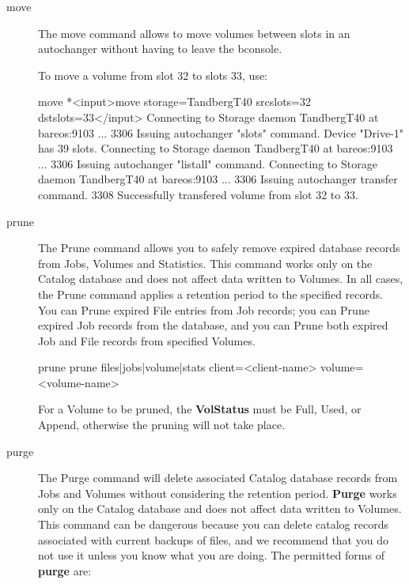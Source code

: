\begin{description}
\item [move]
   The move command allows to move volumes between slots in an autochanger without
   having to leave the bconsole.

   To move a volume from slot 32 to slots 33, use:

\begin{bconsole}{move}
*<input>move storage=TandbergT40 srcslots=32 dstslots=33</input>
Connecting to Storage daemon TandbergT40 at bareos:9103 ...
3306 Issuing autochanger "slots" command.
Device "Drive-1" has 39 slots.
Connecting to Storage daemon TandbergT40 at bareos:9103 ...
3306 Issuing autochanger "listall" command.
Connecting to Storage daemon TandbergT40 at bareos:9103 ...
3306 Issuing autochanger transfer command.
3308 Successfully transfered volume from slot 32 to 33.
\end{bconsole}

\item [prune]
   \label{ManualPruning}
   The Prune command allows you to safely remove expired database records from
   Jobs, Volumes and Statistics.  This command works only on the Catalog
   database and does not affect data written to Volumes.  In all cases, the
   Prune command applies a retention period to the specified records.  You can
   Prune expired File entries from Job records; you can Prune expired Job
   records from the database, and you can Prune both expired Job and File
   records from specified Volumes.

\begin{bconsole}{prune}
prune files|jobs|volume|stats client=<client-name> volume=<volume-name>
\end{bconsole}

   For a Volume to be pruned, the {\bf VolStatus} must be Full, Used, or
   Append, otherwise the pruning will not take place.

\item [purge]
   The Purge command will delete associated Catalog database records from
   Jobs and Volumes without considering the retention period.  {\bf Purge}
   works only on the Catalog database and does not affect data written to
   Volumes.  This command can be dangerous because you can delete catalog
   records associated with current backups of files, and we recommend that
   you do not use it unless you know what you are doing.  The permitted
   forms of {\bf purge} are:


\end{description}
